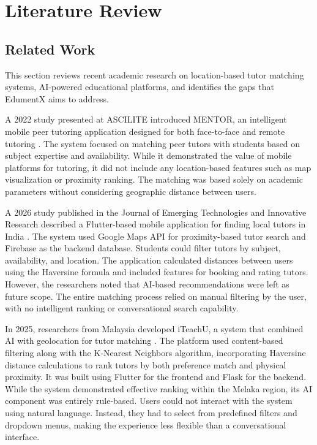 \documentclass[12pt]{report}
\begin{document}
\chapter{Literature Review}

\section{Related Work}

This section reviews recent academic research on location-based tutor matching systems, AI-powered educational platforms, and identifies the gaps that EdumentX aims to address.

\noindent A 2022 study presented at ASCILITE introduced MENTOR, an intelligent mobile peer tutoring application designed for both face-to-face and remote tutoring \citep{chung2022}. The system focused on matching peer tutors with students based on subject expertise and availability. While it demonstrated the value of mobile platforms for tutoring, it did not include any location-based features such as map visualization or proximity ranking. The matching was based solely on academic parameters without considering geographic distance between users.

\noindent A 2026 study published in the Journal of Emerging Technologies and Innovative Research described a Flutter-based mobile application for finding local tutors in India \citep{sharma2026}. The system used Google Maps API for proximity-based tutor search and Firebase as the backend database. Students could filter tutors by subject, availability, and location. The application calculated distances between users using the Haversine formula and included features for booking and rating tutors. However, the researchers noted that AI-based recommendations were left as future scope. The entire matching process relied on manual filtering by the user, with no intelligent ranking or conversational search capability.

\noindent In 2025, researchers from Malaysia developed iTeachU, a system that combined AI with geolocation for tutor matching \citep{shari2025}. The platform used content-based filtering along with the K-Nearest Neighbors algorithm, incorporating Haversine distance calculations to rank tutors by both preference match and physical proximity. It was built using Flutter for the frontend and Flask for the backend. While the system demonstrated effective ranking within the Melaka region, its AI component was entirely rule-based. Users could not interact with the system using natural language. Instead, they had to select from predefined filters and dropdown menus, making the experience less flexible than a conversational interface.
\end{document}
